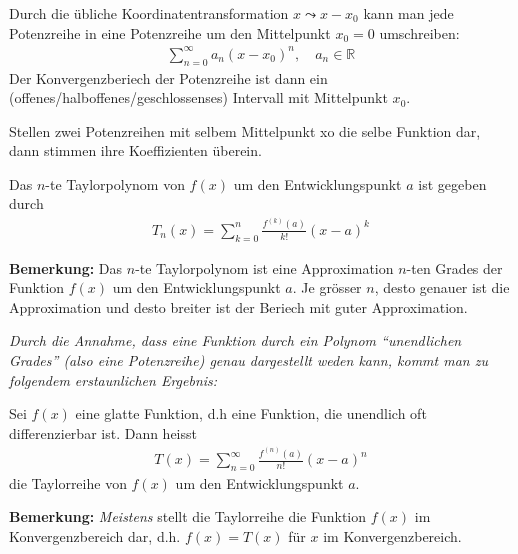 \documentclass[12pt]{article}
\newcommand{\R}{\mathbb{R}} %
\newenvironment{definition}[2][Definition]{\begin{trivlist}
        \item[\hskip \labelsep {\bfseries #1}\hskip \labelsep {\bfseries #2.}]}{\flushright{$\square$}\end{trivlist}}
\newenvironment{lemma}[2][Theorem]{\begin{trivlist}
        \item[\hskip \labelsep {\bfseries #1}\hskip \labelsep {\bfseries #2.}]}{\flushright{$\square$}\end{trivlist}}
\begin{document}
\begin{definition}{[Potenzreihen mit Mittelpunkt $x_0$]}
    Durch die übliche Koordinatentransformation $x\leadsto x-x_0$ kann man jede Potenzreihe in eine Potenzreihe um den Mittelpunkt $x_0=0$ umschreiben:
    \begin{align*}
        \sum_{n=0}^{\infty}a_n (x-x_0)^n, \quad a_n\in\R
    \end{align*}
    Der Konvergenzberiech der Potenzreihe ist dann ein (offenes/halboffenes/geschlossenses) Intervall mit Mittelpunkt $x_0$.
\end{definition}

\begin{lemma}{[Eindeutigkeit von Potenzreihen]}
    Stellen zwei Potenzreihen mit selbem Mittelpunkt
    xo die selbe Funktion dar, dann stimmen ihre Koeffizienten überein.
\end{lemma}

\begin{definition}{[Taylorpolynom]}
    Das $n$-te Taylorpolynom von $f(x)$ um den Entwicklungspunkt $a$ ist gegeben durch
    \begin{align*}
        T_n(x)=\sum_{k=0}^{n}\frac{f^{(k)}(a)}{k!}(x-a)^k
    \end{align*}

    \textbf{Bemerkung:} Das $n$-te Taylorpolynom ist eine Approximation $n$-ten Grades der Funktion $f(x)$ um den Entwicklungspunkt $a$. Je grösser $n$, desto genauer ist die Approximation und desto breiter ist der Beriech mit guter Approximation.
\end{definition}

\textit{Durch die Annahme, dass eine Funktion durch ein Polynom ``unendlichen Grades'' (also eine Potenzreihe) genau dargestellt weden kann, kommt man zu folgendem erstaunlichen Ergebnis:}

\begin{definition}{[Taylorreihe]}
    Sei $f(x)$ eine glatte Funktion, d.h eine Funktion, die unendlich oft differenzierbar ist. Dann heisst
    \begin{align*}
        T(x)=\sum_{n=0}^{\infty}\frac{f^{(n)}(a)}{n!}(x-a)^n
    \end{align*}
    die Taylorreihe von $f(x)$ um den Entwicklungspunkt $a$.

    \textbf{Bemerkung:} \textit{Meistens} stellt die Taylorreihe die Funktion $f(x)$ im Konvergenzbereich dar, d.h. $f(x)=T(x)$ für $x$ im Konvergenzbereich.
\end{definition}
\end{document}
